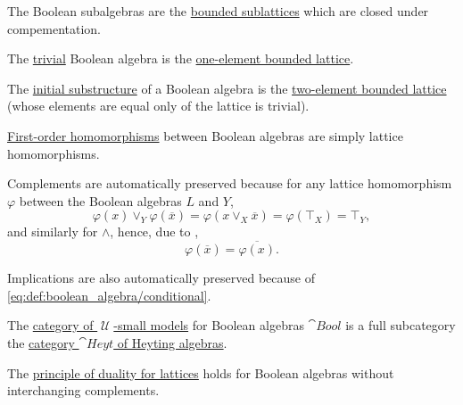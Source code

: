 \begin{definition}
\begin{thmenum}[resume=def:boolean_algebra]
     The Boolean subalgebras are the \hyperref[def:semilattice/submodel]{bounded sublattices} which are closed under compementation.

     The \hyperref[rem:trivial_structure]{trivial} Boolean algebra is the \hyperref[def:semilattice/trivial]{one-element bounded lattice}.

     The \hyperref[thm:substructures_form_complete_lattice/bottom]{initial substructure} of a Boolean algebra is the \hyperref[def:semilattice/trivial]{two-element bounded lattice} (whose elements are equal only of the lattice is trivial).

     \hyperref[def:first_order_homomorphism]{First-order homomorphisms} between Boolean algebras are simply lattice homomorphisms.

    Complements are automatically preserved because for any lattice homomorphism \( \varphi \) between the Boolean algebras \( L \) and \( Y \),
    \begin{equation*}
      \varphi(x) \vee_Y \varphi(\overline x) = \varphi(x \vee_X \overline x) = \varphi(\top_X) = \top_Y,
    \end{equation*}
    and similarly for \( \wedge \), hence, due to ,
    \begin{equation*}
      \varphi(\overline x) = \overline {\varphi(x)}.
    \end{equation*}

    Implications are also automatically preserved because of \eqref{eq:def:boolean_algebra/conditional}.

     The \hyperref[def:category_of_small_first_order_models]{category of \( \mscrU \)-small models} for Boolean algebras \( \cat{Bool} \) is a full subcategory the \hyperref[def:heyting_algebra/category]{category \( \cat{Heyt} \) of Heyting algebras}.

     The \hyperref[def:semilattice/duality]{principle of duality for lattices} holds for Boolean algebras without interchanging complements.
  \end{thmenum}
\end{definition}

